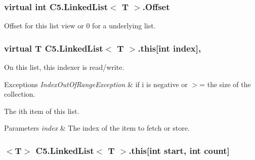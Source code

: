 \hypertarget{class_c5_1_1_linked_list_a2e5e6359550eee9b7bb49011c2d69aff}{}
\subsubsection[{Offset}]{\setlength{\rightskip}{0pt plus 5cm}virtual int {\bf C5.\+Linked\+List}$<$ T $>$.Offset\hspace{0.3cm}{\ttfamily [get]}}\label{class_c5_1_1_linked_list_a2e5e6359550eee9b7bb49011c2d69aff}




Offset for this list view or 0 for a underlying list.\hypertarget{class_c5_1_1_linked_list_a53eaba62445837a11f27c947199ae408}{}
\subsubsection[{this[int index]}]{\setlength{\rightskip}{0pt plus 5cm}virtual T {\bf C5.\+Linked\+List}$<$ T $>$.this\mbox{[}int index\mbox{]}\hspace{0.3cm}{\ttfamily [get]}, {\ttfamily [set]}}\label{class_c5_1_1_linked_list_a53eaba62445837a11f27c947199ae408}


On this list, this indexer is read/write. 
\begin{DoxyExceptions}{Exceptions}
{\em Index\+Out\+Of\+Range\+Exception} & if i is negative or $>$= the size of the collection. \\
\hline
\end{DoxyExceptions}


The i\textquotesingle{}th item of this list.


\begin{DoxyParams}{Parameters}
{\em index} & The index of the item to fetch or store.\\
\hline
\end{DoxyParams}
\hypertarget{class_c5_1_1_linked_list_a97916a234fa4b65f2831365be182fb53}{}
\subsubsection[{this[int start, int count]}]{$<$T$>$ {\bf C5.\+Linked\+List}$<$ T $>$.this\mbox{[}int start, int count\mbox{]}\hspace{0.3cm}{\ttfamily [get]}}\label{class_c5_1_1_linked_list_a97916a234fa4b65f2831365be182fb53}



